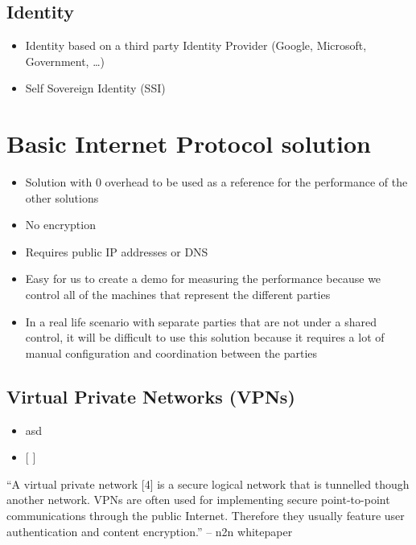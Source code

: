 \hypertarget{identity}{%
\subsection{Identity}\label{identity}}

\begin{itemize}
\tightlist
\item
  Identity based on a third party Identity Provider (Google, Microsoft,
  Government, \ldots)
\item
  Self Sovereign Identity (SSI)
\end{itemize}

\hypertarget{basic-internet-protocol-solution}{%
\section{Basic Internet Protocol
solution}\label{basic-internet-protocol-solution}}

\begin{itemize}
\tightlist
\item
  Solution with 0 overhead to be used as a reference for the performance
  of the other solutions
\item
  No encryption
\item
  Requires public IP addresses or DNS
\item
  Easy for us to create a demo for measuring the performance because we
  control all of the machines that represent the different parties
\item
  In a real life scenario with separate parties that are not under a
  shared control, it will be difficult to use this solution because it
  requires a lot of manual configuration and coordination between the
  parties
\end{itemize}

\hypertarget{virtual-private-networks-vpns}{%
\subsection{Virtual Private Networks
(VPNs)}\label{virtual-private-networks-vpns}}

\begin{itemize}
\item
  asd
\item
  {[} {]}
\end{itemize}

``A virtual private network {[}4{]} is a secure logical network that is
tunnelled though another network. VPNs are often used for implementing
secure point-to-point communications through the public Internet.
Therefore they usually feature user authentication and content
encryption.'' -- n2n whitepaper

